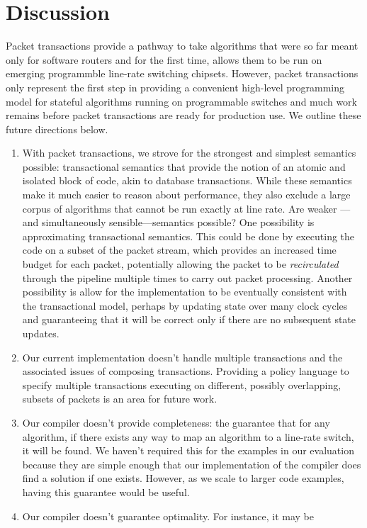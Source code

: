 \section{Discussion}
Packet transactions provide a pathway to take algorithms that were so far meant
only for software routers and for the first time, allows them to be run on
emerging programmble line-rate switching chipsets. However, packet transactions
only represent the first step in providing a convenient high-level programming
model for stateful algorithms running on programmable switches and much work
remains before packet transactions are ready for production use. We outline
these future directions below.

\begin{enumerate}
\item With packet transactions, we strove for the strongest and simplest
semantics possible: transactional semantics that provide the notion of an
atomic and isolated block of code, akin to database transactions. While these
semantics make it much easier to reason about performance, they also exclude a
large corpus of algorithms that cannot be run exactly at line rate. Are weaker
---and simultaneously sensible---semantics possible? One possibility is
approximating transactional semantics. This could be done by executing the code
on a subset of the packet stream, which provides an increased time budget for
each packet, potentially allowing the packet to be {\em recirculated} through
the pipeline multiple times to carry out packet processing. Another possibility
is allow for the implementation to be eventually consistent with the
transactional model, perhaps by updating state over many clock cycles and
guaranteeing that it will be correct only if there are no subsequent state
updates.
\item Our current implementation doesn't handle multiple transactions and the
associated issues of composing transactions. Providing a policy language to
specify multiple transactions executing on different, possibly overlapping,
subsets of packets is an area for future work.
\item Our compiler doesn't provide completeness: the guarantee that for any
algorithm, if there exists any way to map an algorithm to a line-rate switch,
it will be found. We haven't required this for the examples in our evaluation
because they are simple enough that our implementation of the compiler does
find a solution if one exists. However, as we scale to larger code examples,
having this guarantee would be useful.
\item Our compiler doesn't guarantee optimality. For instance, it may be

\end{enumerate}
